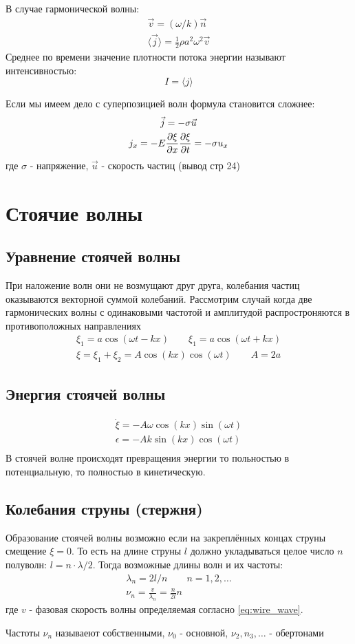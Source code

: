 \documentclass{article}
\begin{document}
В случае гармонической волны:
\begin{gather*}
  \vec{v}=(\omega/k)\vec{n} \\ 
  \langle \vec{j} \rangle=\frac{1}{2}\rho a^{2} \omega^{2} \vec{v}
\end{gather*}
Среднее по времени значение плотности потока энергии называют интенсивностью:
\[
  I=\langle j \rangle
\]

Если мы имеем дело с суперпозицией волн формула становится сложнее:
\begin{gather*}
  \vec{j}=-\sigma\vec{u} \\ 
  j_x=-E \frac{\partial{\xi}}{\partial{x}}\frac{\partial{\xi}}{\partial{t}}=-\sigma u_x
\end{gather*}
где $\sigma$ - напряжение, $\vec{u}$ - скорость частиц (вывод стр 24)

\section{Стоячие волны}
\subsection{Уравнение стоячей волны}
При наложение волн они не возмущают друг друга,
колебания частиц оказываются векторной суммой колебаний.
Рассмотрим случай когда две гармонических волны с одинаковыми
частотой и амплитудой распростроняются в противоположных направлениях
\begin{gather*}
  \xi_1=a\cos(\omega t - kx) \qquad \xi_1=a\cos(\omega t + kx) \\ 
  \xi=\xi_1+\xi_2=A\cos(kx)\cos(\omega t) \qquad A=2a
\end{gather*}
\subsection{Энергия стоячей волны}
\begin{gather*}
  \dot{\xi}=-A\omega \cos(kx)\sin(\omega t) \\ 
  \epsilon=-Ak \sin(kx)\cos(\omega t) \\ 
\end{gather*}
В стоячей волне происходят превращения энергии то польностью в потенциальную,
то полностью в кинетическую.
\subsection{Колебания струны (стержня)}
Образование стоячей волны возможно если на закреплённых концах струны
смещение $\xi=0$. То есть на длине струны $l$ должно укладываться целое число $n$
полуволн: $l=n\cdot \lambda/2$. Тогда возможные длины волн и их частоты:
\begin{gather*}
  \lambda_n=2l/n \qquad n=1,2,\dots  \\ 
  \nu_n=\frac{v}{\lambda_n}=\frac{n}{2l}n
\end{gather*}
где $v$ - фазовая скорость волны определяемая согласно \ref{eq:wire_wave}.

Частоты $\nu_n$ называеют собственными, $\nu_0$ - основной, $\nu_2,n_3,\dots $ - обертонами
\end{document}
